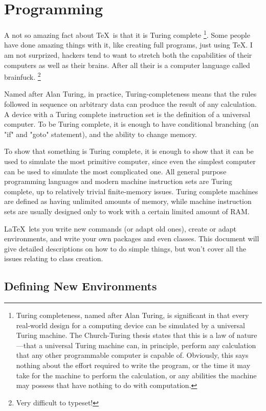 \chapter{Programming}

\normalsize

A not so amazing fact about \TeX\  is that it is Turing complete 
\footnote{Turing completeness, named after Alan Turing, is significant in that every real-world design for a computing device can be simulated by a universal Turing machine. The Church-Turing thesis states that this is a law of nature—that a universal Turing machine can, in principle, perform any calculation that any other programmable computer is capable of. Obviously, this says nothing about the effort required to write the program, or the time it may take for the machine to perform the calculation, or any abilities the machine may possess that have nothing to do with computation.}. 
Some people have done amazing things with it, like creating full programs, just using TeX. I am not surprized, hackers tend to want to stretch both the capabilities of their computers as well as their brains. After all their is a computer language called brainfuck. \footnote{Very difficult to typeset!}

Named after Alan Turing, in practice, Turing-completeness means that the rules followed in sequence on arbitrary data can produce the result of any calculation. A device with a Turing complete instruction set is the definition of a universal computer. To be Turing complete, it is enough to have conditional branching (an "if" and "goto" statement), and the ability to change memory.

To show that something is Turing complete, it is enough to show that it can be used to simulate the most primitive computer, since even the simplest computer can be used to simulate the most complicated one. All general purpose programming languages and modern machine instruction sets are Turing complete, up to relatively trivial finite-memory issues. Turing complete machines are defined as having unlimited amounts of memory, while machine instruction sets are usually designed only to work with a certain limited amount of RAM.

\LaTeX\  lets you write new commands (or adapt old ones), create or adapt environments, and write your own packages and even classes. This document will give detailed descriptions on how to do simple things, but won't cover all the issues relating to class creation.

\section{Defining New Environments}

